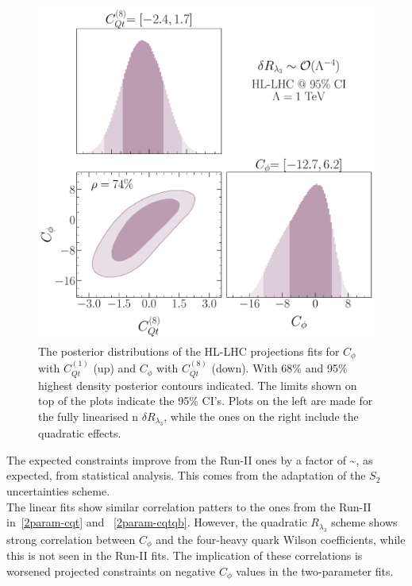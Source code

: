 \begin{figure}[htpb!]
\begin{center}
	\includegraphics[width=0.4\linewidth]{figures/hl-lhc/Cqt8_HL-LHC_quadl3_rge} 
\end{center}
\caption{The posterior distributions of the HL-LHC projections fits for $C_\phi$ with $C_{Qt}^{(1)}$ (up) and $C_\phi$ with $C_{Qt}^{(8)}$ (down). With 68\% and 95\% highest density posterior contours indicated. The limits shown on top of the plots indicate the 95\% CI's. Plots on the left are made for the fully linearised n $\delta R_{\lambda_3}$, while the ones on the right include the quadratic effects.  \label{2param-cqthl}   }
\end{figure}
The expected constraints improve from the Run-II ones by a factor of 
\be
 \sim{},
\ee
as expected, from statistical analysis. This comes from the adaptation of the $S_2$ uncertainties scheme.  \\ The linear fits show similar correlation patters to the ones from the Run-II in~\autoref{2param-cqt} and ~\autoref{2param-cqtqb}. However, the quadratic $R_{\lambda_3}$ scheme shows strong correlation between $C_\phi$ and the four-heavy quark Wilson coefficients, while this is not seen in the Run-II fits. The implication of these correlations is worsened projected constraints on negative $C_\phi$ values in the two-parameter fits. 
